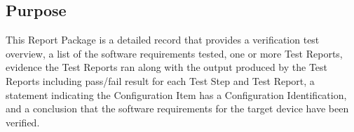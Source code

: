 \subsection{Purpose}
This Report Package is a detailed record that provides a verification test
overview, a list of the software requirements tested, one or more Test
Reports, evidence the Test Reports ran along with the output produced by
the Test Reports including pass/fail result for each Test Step and
Test Report, a statement indicating the Configuration Item has a
Configuration Identification, and a conclusion that the software requirements
for the target device have been verified.
